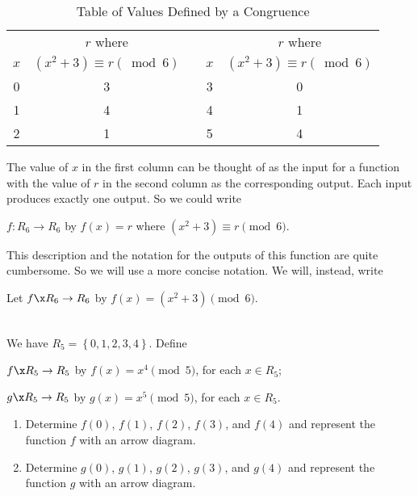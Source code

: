 \begin{table}[h]
\begin{center}
\begin{tabular}[t]{| c | c | c | c | c |} \cline{1-2} \cline{4-5}
   &  $r$ where  &  &  & $r$ where   \\
$x$ & $( {x^2  + 3} ) \equiv r( {\bmod 6} )$ & &  $x$ &  
$( {x^2  + 3} ) \equiv r( {\bmod 6} )$ \\ \cline{1-2} \cline{4-5} %
0  &  3  &  & 3  &  0  \\ \cline{1-2} \cline{4-5}
1  &  4  &  & 4  &  1  \\ \cline{1-2} \cline{4-5}
2  &  1  &  & 5  &  4  \\ \cline{1-2} \cline{4-5}
\end{tabular}
\caption{Table of Values Defined by a Congruence}
\label{Ta:congruence}
\end{center}
\end{table}
The value of  $x$  in the first column can be thought of as the input for a function with the value of  $r$  in the second column as the corresponding output.  Each input produces exactly one output.  So we could write  
\begin{center}
$f:R_6  \to R_6 $  by  $f( x ) = r$ where  
$( {x^2  + 3} ) \equiv r  {\pmod 6} $.
\end{center}
This description and the notation for the outputs of this function are quite cumbersome.  So we will use a more concise notation.  We will, instead, write 
\begin{center}
Let  $f\x R_6  \to R_6 $ by   
$f( x ) = \left( {x^2  + 3} \right) \pmod 6$.
\end{center}
\hbreak

\begin{prog} \label{pr:congfunctions} \hfill \\
We have   $R_5  = \left\{ {0, 1, 2, 3, 4} \right\}$. Define 
\begin{center} $f\x R_5  \to R_5$ by $f(x) = x^4 \pmod 5$, for each $x \in R_5$; 

$g\x R_5 \to R_5$ by $g(x) = x^5 \pmod 5$, for each $x \in R_5$.
\end{center}
\begin{enumerate}
\item Determine $f(0)$, $f(1)$, $f(2)$, $f(3)$, and $f(4)$ and represent the function $f$ with an arrow diagram.
\item Determine $g(0)$, $g(1)$, $g(2)$, $g(3)$, and $g(4)$ and represent the function $g$ with an arrow diagram.
\end{enumerate}
\end{prog}
\hbreak

\endinput
